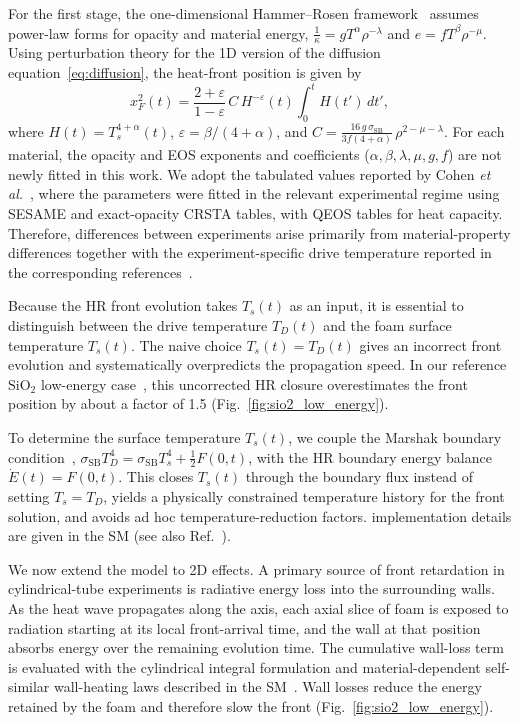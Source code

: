 \documentclass[prl, twocolumn, superscriptaddress, amsmath, amssymb, reprint]{revtex4-2}
\begin{document}
For the first stage, the one-dimensional Hammer--Rosen framework~\cite{Hammer2003,Rosen2009} assumes power-law forms for opacity and material energy,
$\frac{1}{\kappa}=gT^{\alpha}\rho^{-\lambda}$ and $e=fT^{\beta}\rho^{-\mu}$. Using perturbation theory for the 1D version of the diffusion equation~\eqref{eq:diffusion}, the heat-front position is given by
\begin{equation}\label{eq:HR}
    x_F^2(t) = \frac{2+\varepsilon}{1-\varepsilon}\,C\,H^{-\varepsilon}(t)\int_0^t H(t')\,dt',
\end{equation}
where $H(t) = T_s^{4+\alpha}(t)$, $\varepsilon = \beta/(4+\alpha)$, and
	$C = \frac{16\,g\,\sigma_{\mathrm{SB}}}{3f(4+\alpha)}\,\rho^{2-\mu-\lambda}$.
For each material, the opacity and EOS exponents and coefficients ($\alpha,\beta,\lambda,\mu,g,f$) are not newly fitted in this work. We adopt the tabulated values reported by Cohen \textit{et al.}~\cite{Cohen2020Key}, where the parameters were fitted in the relevant experimental regime using SESAME and exact-opacity CRSTA tables, with QEOS tables for heat capacity. Therefore, differences between experiments arise primarily from material-property differences together with the experiment-specific drive temperature reported in the corresponding references~\cite{Back2000PRL,Back2000POP,Moore2015,Courtois2024}.

Because the HR front evolution takes $T_s(t)$ as an input, it is essential to distinguish between the drive temperature $T_D(t)$ and the foam surface temperature $T_s(t)$. The naive choice $T_s(t)=T_D(t)$ gives an incorrect front evolution and systematically overpredicts the propagation speed. In our reference $\mathrm{SiO}_2$ low-energy case~\cite{Back2000PRL}, this uncorrected HR closure overestimates the front position by about a factor of 1.5 (Fig.~\ref{fig:sio2_low_energy}).

To determine the surface temperature $T_s(t)$, we couple the Marshak boundary condition~\cite{Pomraning1979,Olson2000}, $\sigma_{\mathrm{SB}}T_D^4=\sigma_{\mathrm{SB}}T_s^4+\tfrac{1}{2}F(0,t)$, with the HR boundary energy balance $\dot{E}(t)=F(0,t)$. This closes $T_s(t)$ through the boundary flux instead of setting $T_s=T_D$, yields a physically constrained temperature history for the front solution, and avoids ad hoc temperature-reduction factors. implementation details are given in the SM (see also Ref.~\cite{Cohen2018}).

We now extend the model to 2D effects. A primary source of front retardation in cylindrical-tube experiments is radiative energy loss into the surrounding walls. As the heat wave propagates along the axis, each axial slice of foam is exposed to radiation starting at its local front-arrival time, and the wall at that position absorbs energy over the remaining evolution time. The cumulative wall-loss term is evaluated with the cylindrical integral formulation and material-dependent self-similar wall-heating laws described in the SM~\cite{Shussman2015,Cohen2020Key,Cohen2018}.
Wall losses reduce the energy retained by the foam and therefore slow the front (Fig.~\ref{fig:sio2_low_energy}).
\end{document}
